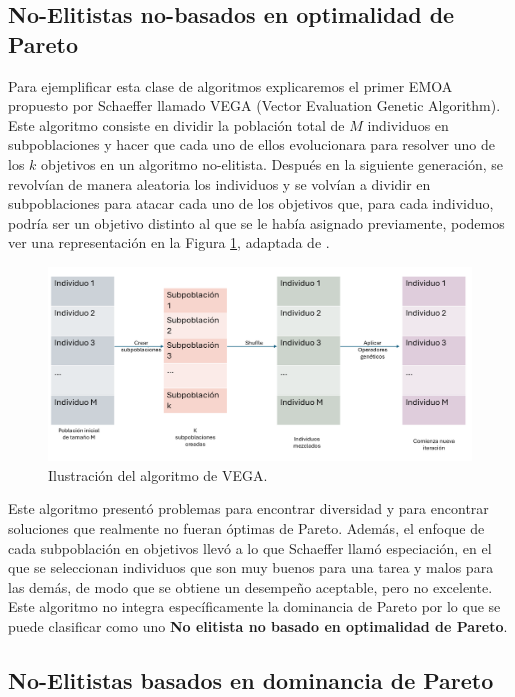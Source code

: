 \subsection*{No-Elitistas no-basados en optimalidad de Pareto} \label{sec:VEGA}

Para ejemplificar esta clase de algoritmos explicaremos el primer EMOA propuesto por Schaeffer \cite{schafferMultipleObjectiveOptimization1984} llamado VEGA (Vector Evaluation Genetic Algorithm). Este algoritmo consiste en dividir la población total de $M$ individuos en subpoblaciones y hacer que cada uno de ellos evolucionara para resolver uno de los $k$ objetivos en un algoritmo no-elitista. Después en la siguiente generación, se revolvían de manera aleatoria los individuos y se volvían a dividir en subpoblaciones para atacar cada uno de los objetivos que, para cada individuo, podría ser un objetivo distinto al que se le había asignado previamente, podemos ver una representación en la Figura \ref{fig:VEGA}, adaptada de \cite{coelloEvolutionaryAlgorithmsSolving}.

\begin{figure}[H]
    \centering
    \includegraphics[width=\textwidth]{Figuras/VEGA_diagrama.png}
    \caption[VEGA]{Ilustración del algoritmo de VEGA.}
    \label{fig:VEGA}
\end{figure}

Este algoritmo presentó problemas para encontrar diversidad y para encontrar soluciones que realmente no fueran óptimas de Pareto. Además, el enfoque de cada subpoblación en objetivos llevó a lo que Schaeffer llamó especiación, en el que se seleccionan individuos que son muy buenos para una tarea y malos para las demás, de modo que se obtiene un desempeño aceptable, pero no excelente. Este algoritmo no integra específicamente la dominancia de Pareto por lo que se puede clasificar como uno \textbf{No elitista no basado en optimalidad de Pareto}.

\subsection*{No-Elitistas basados en dominancia de Pareto}

